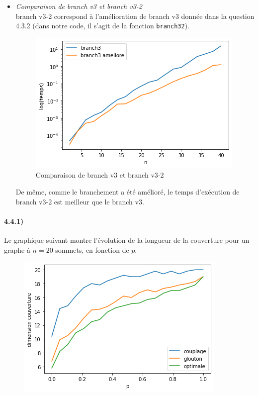 \documentclass[12pt]{article}
\begin{document}
\begin{itemize}
            \item \textit{Comparaison de branch v3 et branch v3-2} \\
                branch v3-2 correspond à l'amélioration de branch v3 donnée dans la question 4.3.2 (dans notre code, il s'agit de la fonction \texttt{branch32}).
            \begin{figure}[H]
                \caption{Comparaison de branch v3 et branch v3-2}
                \includegraphics[scale=0.6]{figures/branch3-3amel.png}
                \centering
            \end{figure}
            De même, comme le branchement a été amélioré, le temps d'exécution de branch v3-2 est meilleur que le branch v3.
            
        \end{itemize}
        

    \paragraph{4.4.1)}
        Le graphique suivant montre l'évolution de la longueur de la couverture pour un graphe à $n=20$ sommets, en fonction de $p$.

        \begin{figure}[H]
            \includegraphics[scale=0.6]{figures/qualite_pvar.png}
            \centering
        \end{figure}
\end{document}
